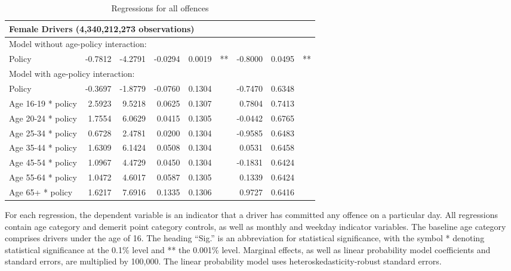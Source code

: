 \begin{table}
\begin{tabular}{l r r r r l r r l}
\hline 

\multicolumn{8}{l}{\textbf{Female Drivers} (4,340,212,273 observations)} \\ 

\hline
\multicolumn{8}{l}{Model without age-policy interaction: } \\ 
Policy                   &  -0.7812        &  -4.2791       &  -0.0294        &  0.0019       &   **       &  -0.8000        &  0.0495       &   **       \\ 
\hline
\multicolumn{8}{l}{Model with age-policy interaction: } \\ 
Policy                   &  -0.3697        &  -1.8779       &  -0.0760        &  0.1304       &            &  -0.7470        &  0.6348       &            \\ 
Age 16-19 * policy   &  2.5923        &  9.5218       &  0.0625        &  0.1307       &            &  0.7804        &  0.7413       &            \\ 
Age 20-24 * policy   &  1.7554        &  6.0629       &  0.0415        &  0.1305       &            &  -0.0442        &  0.6765       &            \\ 
Age 25-34 * policy   &  0.6728        &  2.4781       &  0.0200        &  0.1304       &            &  -0.9585        &  0.6483       &            \\ 
Age 35-44 * policy   &  1.6309        &  6.1424       &  0.0508        &  0.1304       &            &  0.0531        &  0.6458       &            \\ 
Age 45-54 * policy   &  1.0967        &  4.4729       &  0.0450        &  0.1304       &            &  -0.1831        &  0.6424       &            \\ 
Age 55-64 * policy   &  1.0472        &  4.6017       &  0.0587        &  0.1305       &            &  0.1339        &  0.6424       &            \\ 
Age 65+ * policy   &  1.6217        &  7.6916       &  0.1335        &  0.1306       &            &  0.9727        &  0.6416       &            \\ 

\hline 

\end{tabular} 
\caption{Regressions for all offences} 
For each regression, the dependent variable is an indicator that a driver has committed  
any offence on a particular day.  
All regressions contain age category and demerit point category controls, 
as well as monthly and weekday indicator variables. 
The baseline age category comprises drivers under the age of 16. 
The heading ``Sig.'' is an abbreviation for statistical significance, with 
the symbol * denoting statistical significance at the 0.1\% level 
and ** the 0.001\% level. 
Marginal effects, as well as linear probability model coefficients and standard errors, are  
multiplied by 100,000.  
The linear probability model uses heteroskedasticity-robust standard errors. 
\label{tab:seas_Logit_vs_LPMx100K_regs} 
\end{table} 
 
